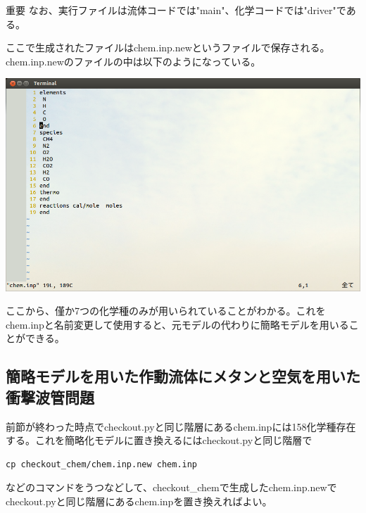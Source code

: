 \documentclass{jsarticle}
\begin{document}
\begin{itembox}[l]{重要}
なお、実行ファイルは流体コードでは"main"、化学コードでは"driver"である。
\end{itembox}

ここで生成されたファイルはchem.inp.newというファイルで保存される。chem.inp.newのファイルの中は以下のようになっている。
\begin{center}
\includegraphics[width=.8\textwidth,bb=0 0 962 577]{tutorial_img/120.png}
\end{center}
ここから、僅か7つの化学種のみが用いられていることがわかる。これをchem.inpと名前変更して使用すると、元モデルの代わりに簡略モデルを用いることができる。

\subsection{簡略モデルを用いた作動流体にメタンと空気を用いた衝撃波管問題}%
前節が終わった時点でcheckout.pyと同じ階層にあるchem.inpには158化学種存在する。これを簡略化モデルに置き換えるにはcheckout.pyと同じ階層で
\begin{verbatim}
cp checkout_chem/chem.inp.new chem.inp
\end{verbatim}
などのコマンドをうつなどして、checkout\_chemで生成したchem.inp.newでcheckout.pyと同じ階層にあるchem.inpを置き換えればよい。
\end{document}
